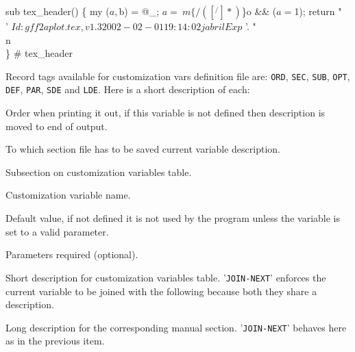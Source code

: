 \documentclass[11pt]{article}
\def\nwendcode{\endtrivlist \endgroup} %
\let\nwdocspar=\par                    %
\begin{document}
\nwenddocs{}\plusendmoddef
sub tex_header() \{
    my ($a,$b) = @_;
    $a =~ m\{/([^/]*)$\}o && ($a = $1);
    return "\\%
           ' $Id: gff2aplot.tex,v 1.3 2002-02-01 19:14:02 jabril Exp $ '.
           "\\n\\%
\} # tex_header
\nwendcode{}\nwdocspar


Record tags available for customization vars definition file are: {\tt{}ORD}, {\tt{}SEC}, {\tt{}SUB}, {\tt{}OPT}, {\tt{}DEF}, {\tt{}PAR}, {\tt{}SDE} and {\tt{}LDE}. Here is a short description of each:

\hfill\parbox{0.95\linewidth}{
\begin{description}\small\setlength{\itemsep}{0ex}\setlength{\parsep}{0ex}
\item[ {\tt{}ORD} ] Order when printing it out, if this variable is not defined then description is moved to end of output.
\item[ {\tt{}SEC} ] To which section file has to be saved current variable description.
\item[ {\tt{}SUB} ] Subsection on customization variables table.
\item[ {\tt{}OPT} ] Customization variable name.
\item[ {\tt{}DEF} ] Default value, if not defined it is not used by the program unless the variable is set to a valid parameter.
\item[ {\tt{}PAR} ] Parameters required (optional).
\item[ {\tt{}SDE} ] Short description for customization variables table. '{\tt{}JOIN-NEXT}' enforces the current variable to be joined with the following because both they share a description.
\item[ {\tt{}LDE} ] Long description for the corresponding manual section. '{\tt{}JOIN-NEXT}' behaves here as in the previous item.
\end{description}
} %
\hfill
\end{document}
